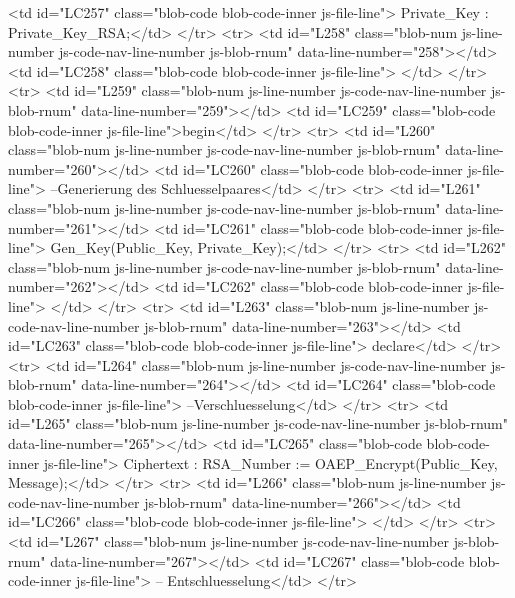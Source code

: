           <td id="LC257" class="blob-code blob-code-inner js-file-line">   Private_Key : Private_Key_RSA;</td>
        </tr>
        <tr>
          <td id="L258" class="blob-num js-line-number js-code-nav-line-number js-blob-rnum" data-line-number="258"></td>
          <td id="LC258" class="blob-code blob-code-inner js-file-line">
</td>
        </tr>
        <tr>
          <td id="L259" class="blob-num js-line-number js-code-nav-line-number js-blob-rnum" data-line-number="259"></td>
          <td id="LC259" class="blob-code blob-code-inner js-file-line">begin</td>
        </tr>
        <tr>
          <td id="L260" class="blob-num js-line-number js-code-nav-line-number js-blob-rnum" data-line-number="260"></td>
          <td id="LC260" class="blob-code blob-code-inner js-file-line">   --Generierung des Schluesselpaares</td>
        </tr>
        <tr>
          <td id="L261" class="blob-num js-line-number js-code-nav-line-number js-blob-rnum" data-line-number="261"></td>
          <td id="LC261" class="blob-code blob-code-inner js-file-line">   Gen_Key(Public_Key, Private_Key);</td>
        </tr>
        <tr>
          <td id="L262" class="blob-num js-line-number js-code-nav-line-number js-blob-rnum" data-line-number="262"></td>
          <td id="LC262" class="blob-code blob-code-inner js-file-line">
</td>
        </tr>
        <tr>
          <td id="L263" class="blob-num js-line-number js-code-nav-line-number js-blob-rnum" data-line-number="263"></td>
          <td id="LC263" class="blob-code blob-code-inner js-file-line">   declare</td>
        </tr>
        <tr>
          <td id="L264" class="blob-num js-line-number js-code-nav-line-number js-blob-rnum" data-line-number="264"></td>
          <td id="LC264" class="blob-code blob-code-inner js-file-line">      --Verschluesselung</td>
        </tr>
        <tr>
          <td id="L265" class="blob-num js-line-number js-code-nav-line-number js-blob-rnum" data-line-number="265"></td>
          <td id="LC265" class="blob-code blob-code-inner js-file-line">      Ciphertext : RSA_Number := OAEP_Encrypt(Public_Key, Message);</td>
        </tr>
        <tr>
          <td id="L266" class="blob-num js-line-number js-code-nav-line-number js-blob-rnum" data-line-number="266"></td>
          <td id="LC266" class="blob-code blob-code-inner js-file-line">
</td>
        </tr>
        <tr>
          <td id="L267" class="blob-num js-line-number js-code-nav-line-number js-blob-rnum" data-line-number="267"></td>
          <td id="LC267" class="blob-code blob-code-inner js-file-line">      -- Entschluesselung</td>
        </tr>
